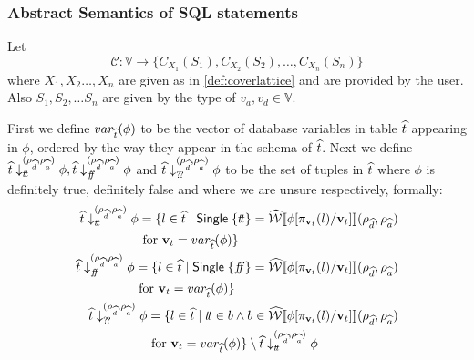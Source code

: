 \subsubsection{Abstract Semantics of SQL statements}

Let
\begin{equation}
    \mathcal{C} : \mathbb{V} \rightarrow \{ C_{X_1}(S_1), C_{X_2}(S_2), \dots, C_{X_n}(S_n) \}
\end{equation}
where $X_1, X_2 \dots ,X_n$ are given as in \autoref{def:coverlattice} and are provided by the user.
Also $S_1, S_2, \dots S_n$ are given by the type of $v_a, v_d \in \mathbb{V}$.

First we define $var_{\widehat{t}}(\phi)$ to be the vector of database variables in table $\widehat{t}$ appearing in $\phi$, ordered by the way they appear in the schema of $\widehat{t}$.
Next we define $\widehat{t} \downarrow_{t\!t}^{(\rho_{\widehat{d}}, \rho_{\widehat{a}})} \phi, \widehat{t} \downarrow_{f\!\!f}^{(\rho_{\widehat{d}}, \rho_{\widehat{a}})} \phi$ and  $\widehat{t} \downarrow_{?\!?}^{(\rho_{\widehat{d}}, \rho_{\widehat{a}})} \phi$ to be the set of tuples in $\widehat{t}$ where $\phi$ is definitely true, definitely false and where we are unsure respectively, formally:
\begin{align}
    \begin{split}
        \abstable \downarrow_{\true}^{(\rho_{\ab{d}}, \rho_{\ab{a}})} \phi &= \{ l \in \ab{t} \mid \mathsf{Single} \; \{ \true \} = \abspredsem{\phi[\pi_{\mathbf{v}_t}(l)/\mathbf{v}_t]}(\rho_{\ab{d}}, \rho_{\ab{a}}) \\
        &\text{ for } \mathbf{v}_t = var_{\ab{t}}(\phi) \}
    \end{split}\\
    \begin{split}
        \abstable \downarrow_{\false}^{(\rho_{\ab{d}}, \rho_{\ab{a}})} \phi &= \{ l \in \ab{t} \mid \mathsf{Single} \; \{ \false \} = \abspredsem{\phi[\pi_{\mathbf{v}_t}(l)/\mathbf{v}_t]}(\rho_{\ab{d}}, \rho_{\ab{a}}) \\
        &\text{ for } \mathbf{v}_t = var_{\ab{t}}(\phi) \}
    \end{split}\\
    \begin{split}
        \abstable \downarrow_{\unknown}^{(\rho_{\ab{d}}, \rho_{\ab{a}})} \phi &= \{ l \in \ab{t} \mid \true \in b \land b \in \abspredsem{\phi[\pi_{\mathbf{v}_t}(l)/\mathbf{v}_t]}(\rho_{\ab{d}}, \rho_{\ab{a}}) \\
        &\text{ for } \mathbf{v}_t = var_{\ab{t}}(\phi) \} \setminus \abstable \downarrow_{\true}^{(\rho_{\ab{d}}, \rho_{\ab{a}})} \phi
    \end{split}
\end{align}

